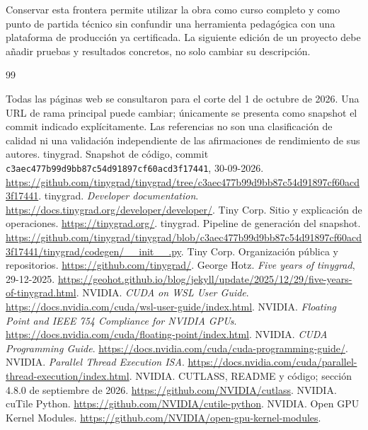 \documentclass[12pt,a4paper,oneside]{report}
\begin{document}
Conservar esta frontera permite utilizar la obra como curso completo y como punto de partida técnico sin confundir una herramienta pedagógica con una plataforma de producción ya certificada. La siguiente edición de un proyecto debe añadir pruebas y resultados concretos, no solo cambiar su descripción.
\renewcommand{\bibname}{Bibliografía y recursos verificables}
\begin{thebibliography}{99}
\item[] Todas las páginas web se consultaron para el corte del 1 de octubre de 2026. Una URL de rama principal puede cambiar; únicamente se presenta como snapshot el commit indicado explícitamente. Las referencias no son una clasificación de calidad ni una validación independiente de las afirmaciones de rendimiento de sus autores.
 tinygrad. Snapshot de código, commit \texttt{c3aec477b99d9\allowbreak{}bb87c54d91897\allowbreak{}cf60acd3f17441}, 30-09-2026. \url{https://github.com/tinygrad/tinygrad/tree/c3aec477b99d9bb87c54d91897cf60acd3f17441}.
 tinygrad. \emph{Developer documentation}. \url{https://docs.tinygrad.org/developer/developer/}.
 Tiny Corp. Sitio y explicación de operaciones. \url{https://tinygrad.org/}.
 tinygrad. Pipeline de generación del snapshot. \url{https://github.com/tinygrad/tinygrad/blob/c3aec477b99d9bb87c54d91897cf60acd3f17441/tinygrad/codegen/__init__.py}.
 Tiny Corp. Organización pública y repositorios. \url{https://github.com/tinygrad/}.
 George Hotz. \emph{Five years of tinygrad}, 29-12-2025. \url{https://geohot.github.io/blog/jekyll/update/2025/12/29/five-years-of-tinygrad.html}.
 NVIDIA. \emph{CUDA on WSL User Guide}. \url{https://docs.nvidia.com/cuda/wsl-user-guide/index.html}.
 NVIDIA. \emph{Floating Point and IEEE 754 Compliance for NVIDIA GPUs}. \url{https://docs.nvidia.com/cuda/floating-point/index.html}.
 NVIDIA. \emph{CUDA Programming Guide}. \url{https://docs.nvidia.com/cuda/cuda-programming-guide/}.
 NVIDIA. \emph{Parallel Thread Execution ISA}. \url{https://docs.nvidia.com/cuda/parallel-thread-execution/index.html}.
 NVIDIA. CUTLASS, README y código; sección 4.8.0 de septiembre de 2026. \url{https://github.com/NVIDIA/cutlass}.
 NVIDIA. cuTile Python. \url{https://github.com/NVIDIA/cutile-python}.
 NVIDIA. Open GPU Kernel Modules. \url{https://github.com/NVIDIA/open-gpu-kernel-modules}.

\end{thebibliography}
\end{document}
